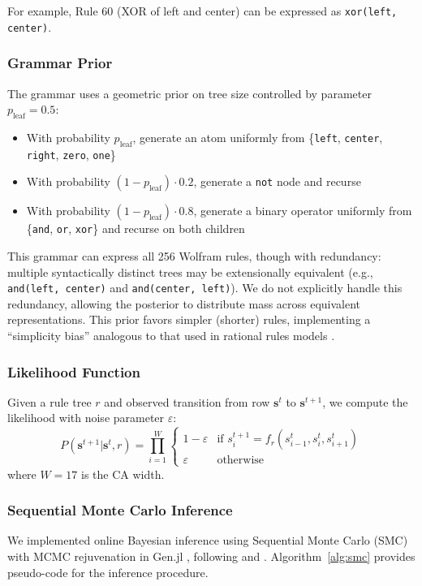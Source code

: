 \documentclass[10pt,letterpaper]{article}
\begin{document}
For example, Rule 60 (XOR of left and center) can be expressed as \texttt{xor(left, center)}.

\subsubsection{Grammar Prior}
The grammar uses a geometric prior on tree size controlled by parameter $p_{\text{leaf}} = 0.5$:
\begin{itemize}
    \item With probability $p_{\text{leaf}}$, generate an atom uniformly from \{\texttt{left}, \texttt{center}, \texttt{right}, \texttt{zero}, \texttt{one}\}
    \item With probability $(1 - p_{\text{leaf}}) \cdot 0.2$, generate a \texttt{not} node and recurse
    \item With probability $(1 - p_{\text{leaf}}) \cdot 0.8$, generate a binary operator uniformly from \{\texttt{and}, \texttt{or}, \texttt{xor}\} and recurse on both children
\end{itemize}

This grammar can express all 256 Wolfram rules, though with redundancy: multiple syntactically distinct trees may be extensionally equivalent (e.g., \texttt{and(left, center)} and \texttt{and(center, left)}). We do not explicitly handle this redundancy, allowing the posterior to distribute mass across equivalent representations. This prior favors simpler (shorter) rules, implementing a ``simplicity bias'' analogous to that used in rational rules models \cite{Goodman2008}.

\subsubsection{Likelihood Function}
Given a rule tree $r$ and observed transition from row $\mathbf{s}^t$ to $\mathbf{s}^{t+1}$, we compute the likelihood with noise parameter $\varepsilon$:
\begin{equation}
    P(\mathbf{s}^{t+1} | \mathbf{s}^t, r) = \prod_{i=1}^{W} 
    \begin{cases}
        1 - \varepsilon & \text{if } s_i^{t+1} = f_r(s_{i-1}^t, s_i^t, s_{i+1}^t) \\
        \varepsilon & \text{otherwise}
    \end{cases}
\end{equation}
where $W = 17$ is the CA width.

\subsubsection{Sequential Monte Carlo Inference}
We implemented online Bayesian inference using Sequential Monte Carlo (SMC) with MCMC rejuvenation in Gen.jl \cite{cusumano2019gen}, following  and . Algorithm~\ref{alg:smc} provides pseudo-code for the inference procedure.
\end{document}
